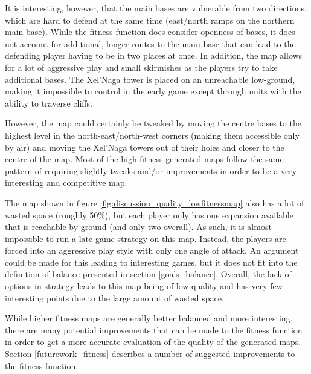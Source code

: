 It is interesting, however, that the main bases are vulnerable from two directions, which are hard to defend at the same time (east/north ramps on the northern main base). While the fitness function does consider openness of bases, it does not account for additional, longer routes to the main base that can lead to the defending player having to be in two places at once. In addition, the map allows for a lot of aggressive play and small skirmishes as the players try to take additional bases. The Xel'Naga tower is placed on an unreachable low-ground, making it impossible to control in the early game except through units with the ability to traverse cliffs.

However, the map could certainly be tweaked by moving the centre bases to the highest level in the north-east/north-west corners (making them accessible only by air) and moving the Xel'Naga towers out of their holes and closer to the centre of the map. Most of the high-fitness generated maps follow the same pattern of requiring slightly tweaks and/or improvements in order to be a very interesting and competitive map.


The map shown in figure \ref{fig:discussion_quality_lowfitnessmap} also has a lot of wasted space (roughly 50\%), but each player only has one expansion available that is reachable by ground (and only two overall). As such, it is almost impossible to run a late game strategy on this map. Instead, the players are forced into an aggressive play style with only one angle of attack. An argument could be made for this leading to interesting games, but it does not fit into the definition of balance presented in section \ref{goals_balance}. Overall, the lack of options in strategy leads to this map being of low quality and has very few interesting points due to the large amount of wasted space.


While higher fitness maps are generally better balanced and more interesting, there are many potential improvements that can be made to the fitness function in order to get a more accurate evaluation of the quality of the generated maps. Section \ref{futurework_fitness} describes a number of suggested improvements to the fitness function.


